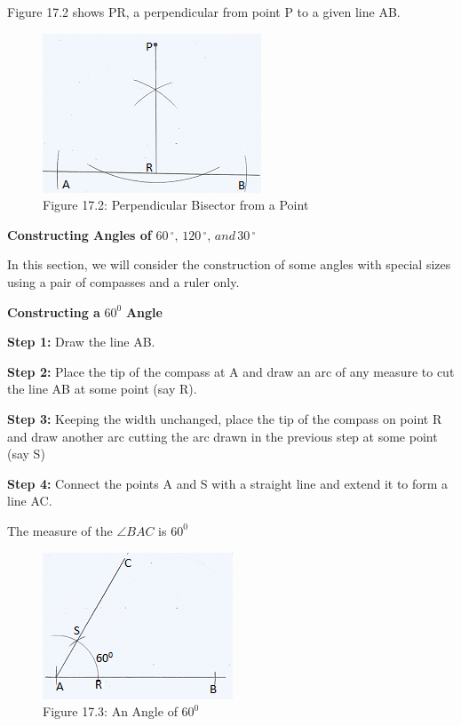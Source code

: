 \documentclass[
  a4paperpaper,
]{scrbook}
\begin{document}
Figure 17.2 shows PR, a perpendicular from point P to a given line AB.

\begin{figure}

{\centering \includegraphics{figures/Images/FIG2.png}

}

\caption{Figure 17.2: Perpendicular Bisector from a Point}

\end{figure}

\textbf{Constructing Angles of}
\(60\,^{\circ}, \,120\,^{\circ},\, and \,30\,^{\circ}\)

In this section, we will consider the construction of some angles with
special sizes using a pair of compasses and a ruler only.

\textbf{Constructing a} \(60^0\) \textbf{Angle}

\textbf{Step 1:} Draw the line AB.

\textbf{Step 2:} Place the tip of the compass at A and draw an arc of
any measure to cut the line AB at some point (say R).

\textbf{Step 3:} Keeping the width unchanged, place the tip of the
compass on point R and draw another arc cutting the arc drawn in the
previous step at some point (say S)

\textbf{Step 4:} Connect the points A and S with a straight line and
extend it to form a line AC.

The measure of the \(\angle BAC\) is \(60^0\)

\begin{figure}

{\centering \includegraphics{figures/Images/FIG3.png}

}

\caption{Figure 17.3: An Angle of \(60^0\)}

\end{figure}
\end{document}
